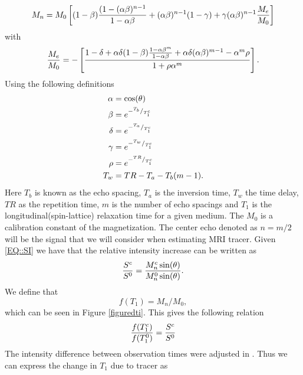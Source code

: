 \documentclass[11pt,a4paper]{article}
\begin{document}
\begin{equation}
M_{n} = M_{0}  \left[ (1-\beta)\frac{(1-(\alpha \beta)\sp{n-1} }{1-\alpha\beta} + (\alpha \beta)\sp{n-1}(1-\gamma) + \gamma ( \alpha \beta)\sp{n-1} \frac{M_{e}}{M_{0}}  \right]   
\end{equation}
with 
\begin{equation}
\frac{M_{e}}{M_{0}} = - \left[ \frac{ 1 -\delta + \alpha \delta (1-\beta ) \frac{1-\alpha\beta\sp{m}}{1-\alpha \beta} + \alpha\delta(\alpha\beta)\sp{m-1} - \alpha\sp{m}\rho}{1 +\rho \alpha\sp{m} } \right].
\end{equation}
Using the following definitions
\begin{equation}
\begin{aligned}
\alpha &= \cos ( \theta ) \\
\beta  &= e\sp{- \sp{T_b}/_{T_1\sp{c}} } \\
\delta &= e\sp{- \sp{T_a}/_{T_1\sp{c}} } \\
\gamma &= e\sp{- \sp{T_w}/_{T_1\sp{c}} } \\
\rho   &= e\sp{- \sp{TR}/_{T_1\sp{c}}}  \\
T_w    &= TR - T_a -T_b(m-1)       .\\
\end{aligned}
\end{equation}
Here $T_b$ is known as the echo spacing, $T_a$ is the inversion time, $T_w$ the time delay, $TR$ as the repetition time, $m$ is the number of echo spacings and $T_1$ is the longitudinal(spin-lattice) relaxation time for a given medium. The $M_0$ is a calibration constant of the magnetization. The center echo denoted as $n=m/2$ will be the signal that we will consider when estimating MRI tracer. Given \eqref{EQ::SI} we have that the relative intensity increase can be written as 
\begin{equation}
\frac{S\sp{c}}{S\sp{0}} = \frac{ M_{n}\sp{c} \sin (\theta)}{ M_{n}\sp{0} \sin (\theta) }.
\end{equation}
We define that  
\begin{equation}
f(T_1) = M_{n}/M_{0} ,
\label{scaledmagnetization}
\end{equation}
which can be seen in Figure \ref{figuredti}. 
This gives the following relation 
\begin{equation}
\frac{f(T_{1}\sp{c} ) }{f(T_{1}\sp{0})}  = \frac{S\sp{c}}{S\sp{0}} 
\end{equation}
The intensity difference between observation times were adjusted in \cite{eidevalnes}. Thus we can express the change in $T_1$ due to tracer as 
\end{document}
